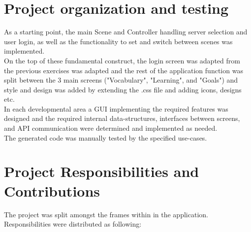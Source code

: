 


\section{Project organization and testing}
As a starting point, the main Scene and Controller handling server selection and user login, as well as the functionality to set and switch between scenes was implemented. \\
On the top of these fundamental construct, the login screen was adapted from the previous exercises was adapted and the rest of the application function was split between the 3 main screens ("Vocabulary", "Learning", and "Goals") and style and design was added by extending the .css file and adding icons, designs etc. \\
In each developmental area a GUI implementing the required features was designed and the required internal data-structures, interfaces between screens, and API communication were determined and implemented as needed. \\
The generated code was manually tested by the specified use-cases.

\section{Project Responsibilities and Contributions}

The project was split amongst the frames within in the application. Responsibilities were distributed as following:

